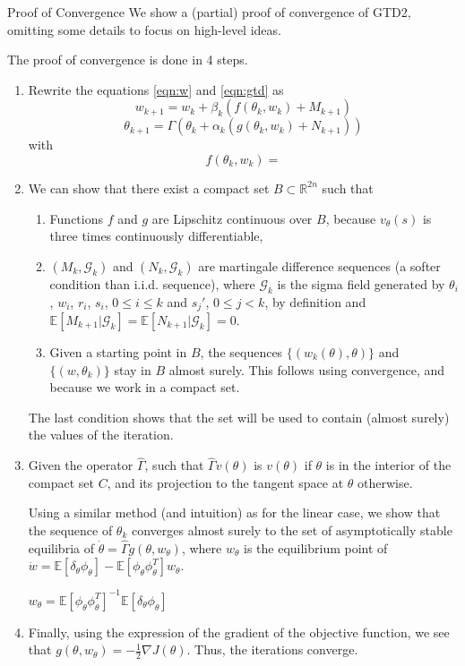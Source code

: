 \documentclass[11pt]{beamer}
\begin{document}
\begin{frame}[allowframebreaks]{Proof of Convergence}
	We show a (partial) proof of convergence of GTD2, omitting some details to focus on high-level ideas.
	
	The proof of convergence is done in 4 steps.
	\begin{enumerate}
		\item Rewrite the equations \ref{eqn:w} and \ref{eqn:gtd} as
		$$w_{k+1} = w_k + \beta_k(f(\theta_k, w_k) + M_{k+1})$$
		$$\theta_{k+1} = \Gamma(\theta_k + \alpha_k(g(\theta_k, w_k) + N_{k+1}))$$
		with
		$$f(\theta_k, w_k) = $$
		
		\framebreak
		
		\item We can show that there exist a compact set $B \subset \mathbb{R}^{2n}$ such that
		\begin{enumerate}
			\item Functions $f$ and $g$ are Lipschitz continuous over $B$, because $v_\theta(s)$ is three times continuously differentiable,
			\item $(M_k, \mathcal{G}_k)$ and $(N_k, \mathcal{G}_k)$ are martingale difference sequences (a softer condition than i.i.d. sequence), where $\mathcal{G}_k$ is the sigma field generated by $\theta_i$, $w_i$, $r_i$, $s_i$, $0 \leqslant i \leqslant k$ and $s_j'$, $0 \leqslant j < k$, by definition and $\mathbb{E}[M_{k+1} | \mathcal{G}_k] = \mathbb{E}[N_{k+1} | \mathcal{G}_k] = 0$.
			\item Given a starting point in $B$, the sequences $\{(w_k(\theta), \theta)\}$ and $\{(w, \theta_k)\}$ stay in $B$ almost surely. This follows using convergence, and because we work in a compact set.
		\end{enumerate}
		The last condition shows that the set will be used to contain (almost surely) the values of the iteration.
		
		\framebreak
		
		\item Given the operator $\hat{\Gamma}$, such that $\hat{\Gamma}v(\theta)$ is $v(\theta)$ if $\theta$ is in the interior of the compact set $C$, and its projection to the tangent space at $\theta$ otherwise.
		
		\vspace{1em}
		Using a similar method (and intuition) as for the linear case, we show that the sequence of $\theta_k$ converges almost surely to the set of asymptotically stable equilibria of $\dot{\theta} = \hat{\Gamma} g(\theta, w_\theta)$, where $w_\theta$ is the equilibrium point of $\dot{w} = \mathbb{E}[\delta_\theta\phi_\theta] - \mathbb{E}[\phi_\theta\phi_\theta^T]w_\theta$.
		
		\vspace{1em}
		$w_\theta = \mathbb{E}[\phi_\theta\phi_\theta^T]^{-1}\mathbb{E}[\delta_\theta\phi_\theta]$
		
		\framebreak
		
		\item Finally, using the expression of the gradient of the objective function, we see that $g(\theta, w_\theta) = -\frac{1}{2} \nabla{}J(\theta)$. Thus, the iterations converge.
	\end{enumerate}
\end{frame}
\end{document}
